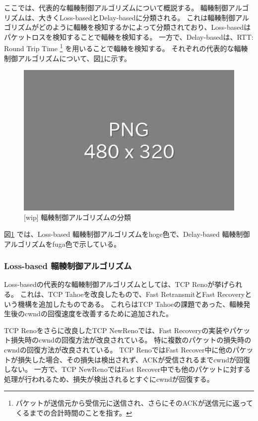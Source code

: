 \documentclass[a4paper,11pt]{jreport}
\newcommand{\figref}[1]{図\ref{#1}}
\begin{document}
ここでは、代表的な輻輳制御アルゴリズムについて概説する。
輻輳制御アルゴリズムは、大きくLoss-basedとDelay-basedに分類される。
これは輻輳制御アルゴリズムがどのように輻輳を検知するかによって分類されており、Loss-basedはパケットロスを検知することで輻輳を検知する。
一方で、Delay-basedは、RTT: Round Trip Time
\footnote{パケットが送信元から受信元に送信され、さらにそのACKが送信元に返ってくるまでの合計時間のことを指す。}
を用いることで輻輳を検知する。
それぞれの代表的な輻輳制御アルゴリズムについて、\figref{figure:congestion_control_classification}に示す。
\begin{figure}[htbp]
  \centering
  \includegraphics[width=0.6\linewidth]{fig/chap02/empty.png}
  \caption{[wip] 輻輳制御アルゴリズムの分類}
  \label{figure:congestion_control_classification}
\end{figure}
\figref{figure:congestion_control_classification} では、Loss-based 輻輳制御アルゴリズムをhoge色で、Delay-based 輻輳制御アルゴリズムをfuga色で示している。

\subsubsection*{Loss-based 輻輳制御アルゴリズム}

Loss-basedの代表的な輻輳制御アルゴリズムとしては、TCP Reno\cite{reno,tcp}が挙げられる。
これは、TCP Tahoe\cite{congestion-avoidance}を改良したもので、Fast RetransmitとFast Recoveryという機構を追加したものである。
これらはTCP Tahoeの課題であった、輻輳発生後のcwndの回復速度を改善するために追加された。

TCP Renoをさらに改良したTCP NewReno\cite{floyd2004newreno,henderson2012newreno}では、Fast Recoveryの実装やパケット損失時のcwndの回復方法が改良されている。
特に複数のパケットの損失時のcwndの回復方法が改良されている。
TCP RenoではFast Recover中に他のパケットが損失した場合、その損失は検出されず、ACKが受信されるまでcwndが回復しない。
一方で、TCP NewRenoではFast Recover中でも他のパケットに対する処理が行われるため、損失が検出されるとすぐにcwndが回復する。
\end{document}
